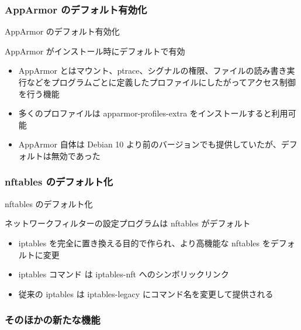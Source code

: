 \subsubsection{AppArmor のデフォルト有効化}


\begin{frame}{AppArmor のデフォルト有効化}%

AppArmor がインストール時にデフォルトで有効
 
\begin{itemize}
\item AppArmor とはマウント、ptrace、シグナルの権限、ファイルの読み書き実行などをプログラムごとに定義したプロファイルにしたがってアクセス制御を行う機能
\item 多くのプロファイルは apparmor-profiles-extra をインストールすると利用可能
\item AppArmor 自体は Debian 10 より前のバージョンでも提供していたが、デフォルトは無効であった
\end{itemize}
    
\end{frame}


\subsubsection{nftables のデフォルト化}


\begin{frame}{nftables のデフォルト化}%

ネットワークフィルターの設定プログラムは nftables がデフォルト
  
\begin{itemize}
\item iptables を完全に置き換える目的で作られ、より高機能な nftables をデフォルトに変更
\item iptables コマンド は iptables-nft へのシンボリックリンク
\item 従来の iptables は iptables-legacy にコマンド名を変更して提供される
\end{itemize}
    
\end{frame}


\subsubsection{そのほかの新たな機能}

